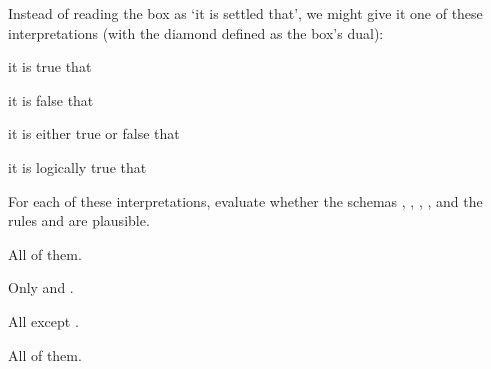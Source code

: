 \begin{exercise}
  Instead of reading the box as `it is settled that', we might give it one of these interpretations (with the diamond defined as the box's dual):
  \begin{exlist}
    \item it is true that
    \item it is false that
    \item it is either true or false that
    \item it is logically true that
  \end{exlist}
  \medskip\noindent%
  For each of these interpretations, evaluate whether the schemas , , , , and the rules  and  are plausible. 
\end{exercise}
\begin{solution}
  \begin{sollist}
    \item All of them.
    \item Only  and .
    \item All except .
    \item All of them.




\end{sollist}
\end{solution}
